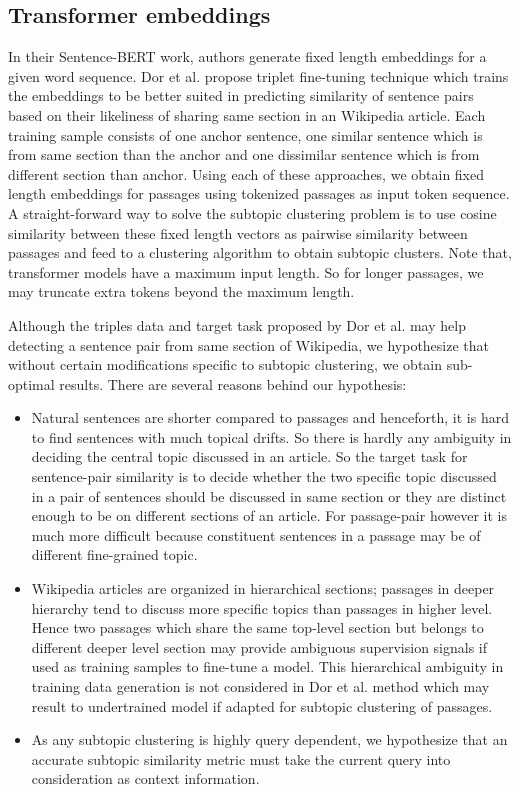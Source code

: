 \subsection{Transformer embeddings} In their Sentence-BERT work, authors generate fixed length embeddings for a given word sequence. Dor et al. \cite{dor2018learning} propose triplet fine-tuning technique which trains the embeddings to be better suited in predicting similarity of sentence pairs based on their likeliness of sharing same section in an Wikipedia article. Each training sample consists of one anchor sentence, one similar sentence which is from same section than the anchor and one dissimilar sentence which is from different section than anchor. Using each of these approaches, we obtain fixed length embeddings for passages using tokenized passages as input token sequence. A straight-forward way to solve the subtopic clustering problem is to use cosine similarity between these fixed length vectors as pairwise similarity between passages and feed to a clustering algorithm to obtain subtopic clusters. Note that, transformer models have a maximum input length. So for longer passages, we may truncate extra tokens beyond the maximum length. 

Although the triples data and target task proposed by Dor et al. may help detecting a sentence pair from same section of Wikipedia, we hypothesize that without certain modifications specific to subtopic clustering, we obtain sub-optimal results. There are several reasons behind our hypothesis: 
\begin{itemize}
    \item Natural sentences are shorter compared to passages and henceforth, it is hard to find sentences with much topical drifts. So there is hardly any ambiguity in deciding the central topic discussed in an article. So the target task for sentence-pair similarity is to decide whether the two specific topic discussed in a pair of sentences should be discussed in same section or they are distinct enough to be on different sections of an article. For passage-pair however it is much more difficult because constituent sentences in a passage may be of different fine-grained topic.
    \item Wikipedia articles are organized in hierarchical sections; passages in deeper hierarchy tend to discuss more specific topics than passages in higher level. Hence two passages which share the same top-level section but belongs to different deeper level section may provide ambiguous supervision signals if used as training samples to fine-tune a model. This hierarchical ambiguity in training data generation is not considered in Dor et al. method which may result to undertrained model if adapted for subtopic clustering of passages.
    \item As any subtopic clustering is highly query dependent, we hypothesize that an accurate subtopic similarity metric must take the current query into consideration as context information.
\end{itemize}

